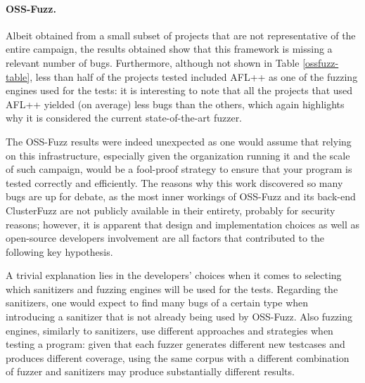 \paragraph{OSS-Fuzz.} Albeit obtained from a small subset of projects that are not representative of the entire campaign, the results obtained show that this framework is missing a relevant number of bugs. Furthermore, although not shown in Table \ref{ossfuzz-table}, less than half of the projects tested included AFL++ as one of the fuzzing engines used for the tests: it is interesting to note that all the projects that used AFL++ yielded (on average) less bugs than the others, which again highlights why it is considered the current state-of-the-art fuzzer.

The OSS-Fuzz results were indeed unexpected as one would assume that relying on this infrastructure, especially given the organization running it and the scale of such campaign, would be a fool-proof strategy to ensure that your program is tested correctly and efficiently. The reasons why this work discovered so many bugs are up for debate, as the most inner workings of OSS-Fuzz and its back-end ClusterFuzz are not publicly available in their entirety, probably for security reasons; however, it is apparent that design and implementation choices as well as open-source developers involvement are all factors that contributed to the following key hypothesis.

A trivial explanation lies in the developers' choices when it comes to selecting which sanitizers and fuzzing engines will be used for the tests. Regarding the sanitizers, one would expect to find many bugs of a certain type when introducing a sanitizer that is not already being used by OSS-Fuzz. Also fuzzing engines, similarly to sanitizers, use different approaches and strategies when testing a program: given that each fuzzer generates different new testcases and produces different coverage, using the same corpus with a different combination of fuzzer and sanitizers may produce substantially different results. 

